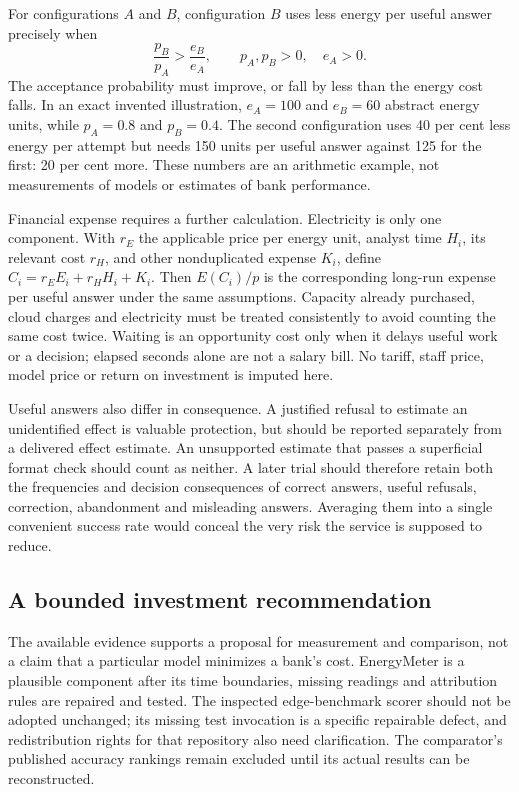 For configurations $A$ and $B$, configuration $B$ uses less energy per useful
answer precisely when
\begin{equation}
 \frac{p_B}{p_A}>\frac{e_B}{e_A},
 \qquad p_A,p_B>0,\quad e_A>0.
 \label{closure:energy-break-even}
\end{equation}
The acceptance probability must improve, or fall by less than the energy
cost falls. In an exact invented illustration, $e_A=100$ and $e_B=60$
abstract energy units, while $p_A=0.8$ and $p_B=0.4$. The second configuration
uses 40 per cent less energy per attempt but needs 150 units per useful
answer against 125 for the first: 20 per cent more. These numbers are an
arithmetic example, not measurements of models or estimates of bank
performance.

Financial expense requires a further calculation. Electricity is only one
component. With $r_E$ the applicable price per energy unit, analyst time
$H_i$, its relevant cost $r_H$, and other nonduplicated expense $K_i$, define
$C_i=r_E E_i+r_H H_i+K_i$. Then $E(C_i)/p$ is the corresponding long-run
expense per useful answer under the same assumptions. Capacity already
purchased, cloud charges and electricity must be treated consistently to
avoid counting the same cost twice. Waiting is an opportunity cost only
when it delays useful work or a decision; elapsed seconds alone are not a
salary bill. No tariff, staff price, model price or return on investment is
imputed here.

Useful answers also differ in consequence. A justified refusal to estimate
an unidentified effect is valuable protection, but should be reported
separately from a delivered effect estimate. An unsupported estimate that
passes a superficial format check should count as neither. A later trial
should therefore retain both the frequencies and decision consequences of
correct answers, useful refusals, correction, abandonment and misleading
answers. Averaging them into a single convenient success rate would conceal
the very risk the service is supposed to reduce.

\subsection{A bounded investment recommendation}

The available evidence supports a proposal for measurement and comparison,
not a claim that a particular model minimizes a bank's cost. EnergyMeter is
a plausible component after its time boundaries, missing readings and
attribution rules are repaired and tested. The inspected edge-benchmark
scorer should not be adopted unchanged; its missing test invocation is a
specific repairable defect, and redistribution rights for that repository
also need clarification. The comparator's published accuracy rankings
remain excluded until its actual results can be reconstructed.

